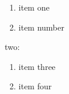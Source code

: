 \documentclass{article}
\begin{document}
\begin{enumerate}
\item item one
\item item number
\end{enumerate}
two:
\begin{enumerate}
\item item three
\item item four
\end{enumerate}
\end{document}

